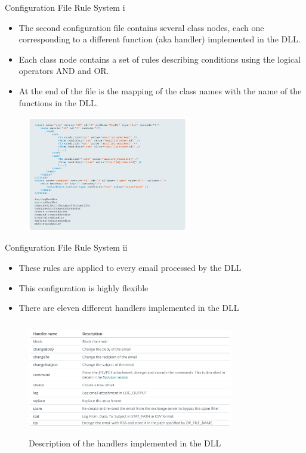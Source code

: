 \begin{frame}[fragile]{Configuration File Rule System i}
    \begin{itemize}
        \item The second configuration file contains several class nodes, each one corresponding to a different function 
        (aka handler) implemented in the DLL. 
        \item Each class node contains a set of rules describing conditions using the logical operators AND and OR. 
        \item At the end of the file is the mapping of the class names with the name of the functions in the DLL.
    \end{itemize}
    \begin{figure}
        \includegraphics[width=7cm]{figures/rule_file.PNG}
    \end{figure}
\end{frame}

\begin{frame}[fragile]{Configuration File Rule System ii}
    \begin{itemize}
        \item These rules are applied to every email processed by the DLL
        \item This configuration is highly flexible
        \item There are eleven different handlers implemented in the DLL 
    \end{itemize}
    \begin{figure}
        \includegraphics[height=5cm, width=9cm]{figures/handlers.PNG}
        \caption{Description of the handlers implemented in the DLL}
    \end{figure}
\end{frame}

